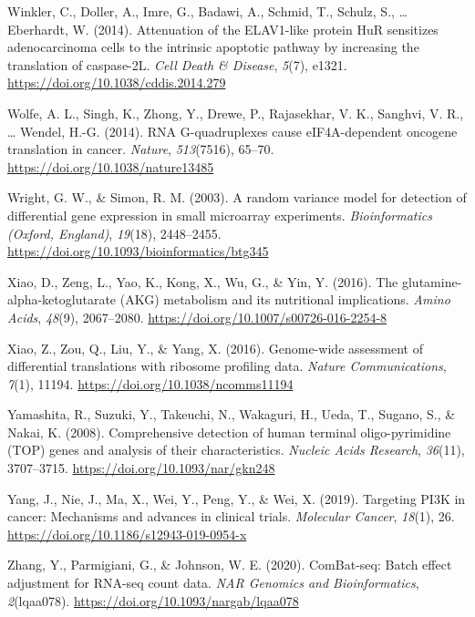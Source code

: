 \documentclass[12pt,openany]{book}
\begin{document}
\hypertarget{ref-Winkler2014}{}
Winkler, C., Doller, A., Imre, G., Badawi, A., Schmid, T., Schulz, S.,
\ldots{} Eberhardt, W. (2014). Attenuation of the ELAV1-like protein HuR
sensitizes adenocarcinoma cells to the intrinsic apoptotic pathway by
increasing the translation of caspase-2L. \emph{Cell Death \& Disease},
\emph{5}(7), e1321. \url{https://doi.org/10.1038/cddis.2014.279}

\hypertarget{ref-Wolfe2014}{}
Wolfe, A. L., Singh, K., Zhong, Y., Drewe, P., Rajasekhar, V. K.,
Sanghvi, V. R., \ldots{} Wendel, H.-G. (2014). RNA G-quadruplexes cause
eIF4A-dependent oncogene translation in cancer. \emph{Nature},
\emph{513}(7516), 65--70. \url{https://doi.org/10.1038/nature13485}

\hypertarget{ref-Wright2003}{}
Wright, G. W., \& Simon, R. M. (2003). A random variance model for
detection of differential gene expression in small microarray
experiments. \emph{Bioinformatics (Oxford, England)}, \emph{19}(18),
2448--2455. \url{https://doi.org/10.1093/bioinformatics/btg345}

\hypertarget{ref-Xiao2016a}{}
Xiao, D., Zeng, L., Yao, K., Kong, X., Wu, G., \& Yin, Y. (2016). The
glutamine-alpha-ketoglutarate (AKG) metabolism and its nutritional
implications. \emph{Amino Acids}, \emph{48}(9), 2067--2080.
\url{https://doi.org/10.1007/s00726-016-2254-8}

\hypertarget{ref-Xiao2016}{}
Xiao, Z., Zou, Q., Liu, Y., \& Yang, X. (2016). Genome-wide assessment
of differential translations with ribosome profiling data. \emph{Nature
Communications}, \emph{7}(1), 11194.
\url{https://doi.org/10.1038/ncomms11194}

\hypertarget{ref-Yamashita2008}{}
Yamashita, R., Suzuki, Y., Takeuchi, N., Wakaguri, H., Ueda, T., Sugano,
S., \& Nakai, K. (2008). Comprehensive detection of human terminal
oligo-pyrimidine (TOP) genes and analysis of their characteristics.
\emph{Nucleic Acids Research}, \emph{36}(11), 3707--3715.
\url{https://doi.org/10.1093/nar/gkn248}

\hypertarget{ref-Yang2019}{}
Yang, J., Nie, J., Ma, X., Wei, Y., Peng, Y., \& Wei, X. (2019).
Targeting PI3K in cancer: Mechanisms and advances in clinical trials.
\emph{Molecular Cancer}, \emph{18}(1), 26.
\url{https://doi.org/10.1186/s12943-019-0954-x}

\hypertarget{ref-Zhang2020}{}
Zhang, Y., Parmigiani, G., \& Johnson, W. E. (2020). ComBat-seq: Batch
effect adjustment for RNA-seq count data. \emph{NAR Genomics and
Bioinformatics}, \emph{2}(lqaa078).
\url{https://doi.org/10.1093/nargab/lqaa078}
\end{document}
